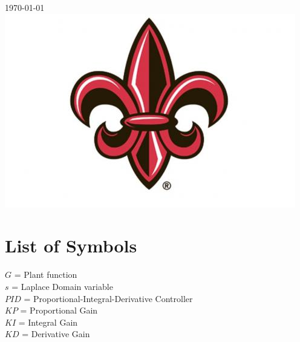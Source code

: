 \documentclass[12pt]{article}
\begin{document}
\begin{titlepage}


{\textsc{\large \today}}\\[2cm] %


\includegraphics[width=5in]{UL_logo.jpg}\\[1cm] %
 

\vfill %

\end{titlepage}


\tableofcontents

\listoffigures

\section*{\fontsize{12}{12}\selectfont \large List of Symbols}
$G$ = Plant function \\
$s$ = Laplace Domain variable \\
$PID$ = Proportional-Integral-Derivative Controller \\
$KP$ = Proportional Gain \\
$KI$ = Integral Gain \\
$KD$ = Derivative Gain \\
\end{document}
